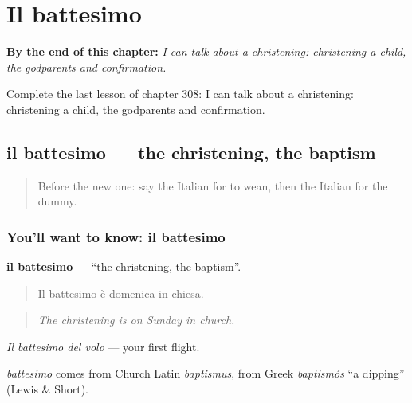 
\chapter{Il battesimo}
\label{ch:it-il-battesimo}

\begin{chapteropening}
\textbf{By the end of this chapter:} \emph{I can talk about a christening: christening a child, the godparents and confirmation.}

Complete the last lesson of chapter 308: I can talk about a christening: christening a child, the godparents and confirmation.
\end{chapteropening}

\section[il battesimo]{il battesimo — the christening, the baptism}

\label{lesson:IT-C308-battesimo}



\begin{quote}
Before the new one: say the Italian for to wean, then the Italian for the dummy.
\end{quote}

\subsection*{You'll want to know: il battesimo}
\textbf{il battesimo} — \textquotedblleft{}the christening, the baptism\textquotedblright{}.

\begin{quote}
Il battesimo è domenica in chiesa.
\end{quote}

\begin{quote}
\emph{The christening is on Sunday in church.}
\end{quote}

\emph{Il battesimo del volo} — your first flight.

\begin{cousinweb}
\emph{battesimo} comes from Church Latin \emph{baptismus}, from Greek \emph{baptismós} \textquotedblleft{}a dipping\textquotedblright{} (Lewis \& Short).
\end{cousinweb}

